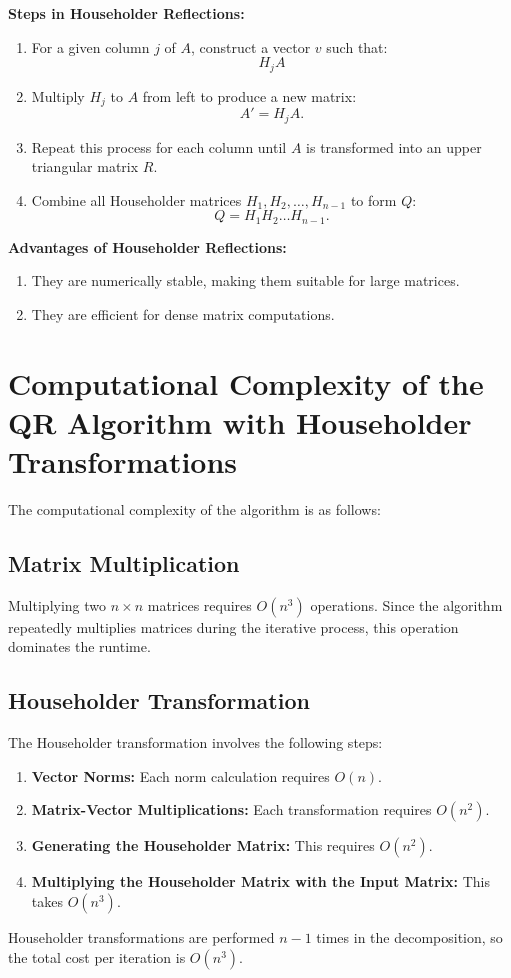 \documentclass[12pt]{article}
\begin{document}
\textbf{Steps in Householder Reflections:}
\begin{enumerate}
    \item For a given column $ j $ of $ A $, construct a vector $ v $ such that:
    \[
    H_j A
    \]
    \item Multiply $ H_j $ to $ A $ from left to produce a new matrix:
    \[
    A' = H_j A.
    \]
    \item Repeat this process for each column until $ A $ is transformed into an upper triangular matrix $ R $.
    \item Combine all Householder matrices $ H_1, H_2, \dots, H_{n-1} $ to form $ Q $:
    \[
    Q = H_1 H_2 \dots H_{n-1}.
    \]
\end{enumerate}

\textbf{Advantages of Householder Reflections:}
\begin{enumerate}
    \item They are numerically stable, making them suitable for large matrices.
    \item They are efficient for dense matrix computations.
\end{enumerate}

\section{Computational Complexity of the QR Algorithm with Householder Transformations}
 The computational complexity of the algorithm is as follows:

\subsection{ Matrix Multiplication}
Multiplying two \(n \times n\) matrices requires \(O(n^3)\) operations. Since the algorithm repeatedly multiplies matrices during the iterative process, this operation dominates the runtime.

\subsection{ Householder Transformation}
The Householder transformation involves the following steps:
\begin{enumerate}
    \item 
    \textbf{Vector Norms:} Each norm calculation requires \(O(n)\).
    \item \textbf{Matrix-Vector Multiplications:} Each transformation requires \(O(n^2)\).
    \item \textbf{Generating the Householder Matrix:} This requires \(O(n^2)\).
    \item \textbf{Multiplying the Householder Matrix with the Input Matrix:} This takes \(O(n^3)\).
\end{enumerate}
Householder transformations are performed \(n-1\) times in the decomposition, so the total cost per iteration is \(O(n^3)\).
\end{document}
